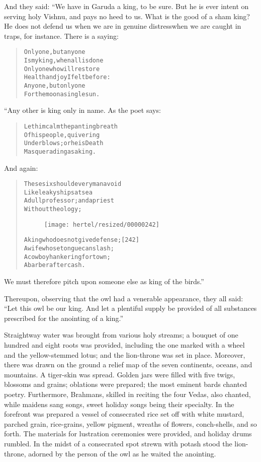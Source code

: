 \documentclass[article, twoside, 10pt]{memoir}
\renewenvironment{verbatim}{%
\begin{quote}%
\vskip -10pt%
\begin{alltt}\normalfont\small}{\end{alltt}%
\end{quote}%
\vskip -10pt
} %
\begin{document}
And they said: “We have in Garuda a king, to be sure. But he is
ever intent on serving holy Vishnu, and pays no heed to us. What is
the good of a sham king? He does not defend us when we are in
genuine distress{\textemdash}when we are caught in traps, for instance. There
is a saying:

\begin{verbatim}
Only one, but anyone
Is my king, when all is done{\textemdash}
Only one who will restore
Health and joy I felt before:
Anyone, but only one{\textemdash}
For the moon a single sun.
\end{verbatim}
“Any other is king only in name. As the poet says:

\begin{verbatim}
Let him calm the panting breath
    Of his people, quivering
Under blows; or he is Death
    Masquerading as a king.
\end{verbatim}
And again:

\begin{verbatim}
These six should every man avoid
    Like leaky ships at sea{\textemdash}
A dull professor; and a priest
    Without theology;

\begin{figure}[p]\texttt{[image: hertel/resized/00000242]}\end{figure}A king who does not give defense;                       [242]
    A wife whose tongue can slash;
A cowboy hankering for town;
    A barber after cash.
\end{verbatim}
We must therefore pitch upon someone else as king of the birds.”

Thereupon, observing that the owl had a venerable appearance, they
all said:
``Let this owl be our king. And let a plentiful supply be provided of all substances prescribed for the anointing of a king.''

Straightway water was brought from various holy streams; a bouquet
of one hundred and eight roots was provided, including the one
marked with a wheel and the yellow-stemmed lotus; and the
lion-throne was set in place. Moreover, there was drawn on the
ground a relief map of the seven continents, oceans, and mountains.
A tiger-skin was spread. Golden jars were filled with five twigs,
blossoms and grains; oblations were prepared; the most eminent
bards chanted poetry. Furthermore, Brahmans, skilled in reciting
the four Vedas, also chanted, while maidens sang songs, sweet
holiday songs being their specialty. In the forefront was prepared
a vessel of consecrated rice set off with white mustard, parched
grain, rice-grains, yellow pigment, wreaths of flowers,
conch-shells, and so forth. The materials for lustration ceremonies
were provided, and holiday drums rumbled. In the midst of a
consecrated spot strewn with potash stood the lion-throne, adorned
by the person of the owl as he waited the anointing.
\end{document}
